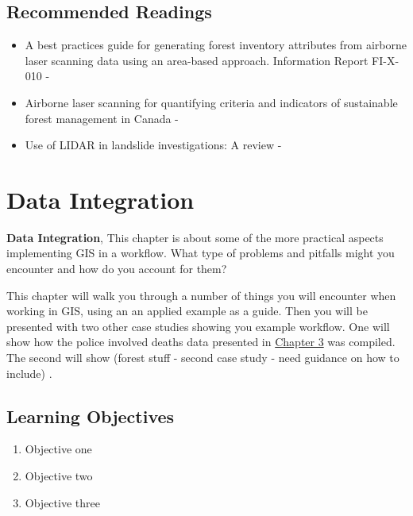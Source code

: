 \documentclass[
]{book}
\providecommand{\tightlist}{%
  \setlength{\itemsep}{0pt}\setlength{\parskip}{0pt}}
\begin{document}
\hypertarget{recommended-readings-4}{%
\section*{Recommended Readings}\label{recommended-readings-4}}

\begin{itemize}
\tightlist
\item
  A best practices guide for generating forest inventory attributes from airborne laser scanning data using an area-based approach. Information Report FI-X-010 - \citet{white_best_2013}
\item
  Airborne laser scanning for quantifying criteria and indicators of sustainable forest management in Canada - \citet{goodbody_airborne_2021}
\item
  Use of LIDAR in landslide investigations: A review - \citet{jaboyedoff_use_2012}
\end{itemize}

\hypertarget{data-integration}{%
\chapter{Data Integration}\label{data-integration}}

\textbf{Data Integration}, This chapter is about some of the more practical aspects implementing GIS in a workflow. What type of problems and pitfalls might you encounter and how do you account for them?

This chapter will walk you through a number of things you will encounter when working in GIS, using an an applied example as a guide. Then you will be presented with two other case studies showing you example workflow. One will show how the police involved deaths data presented in \href{https://ubc-geomatics-textbook.github.io/geomatics-textbook/types-of-data.html}{Chapter 3} was compiled. The second will show (forest stuff - second case study - need guidance on how to include) \citep{skeeter_controls_2022}.

\hypertarget{learning-objectives-15}{%
\section*{Learning Objectives}\label{learning-objectives-15}}

\begin{enumerate}
\def\labelenumi{\arabic{enumi}.}
\tightlist
\item
  Objective one
\item
  Objective two
\item
  Objective three
\end{enumerate}
\end{document}
